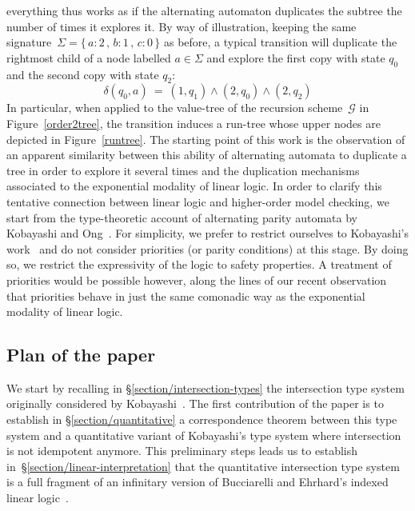 \documentclass{eptcs}
\begin{document}
everything thus works as if the alternating automaton duplicates the subtree the number of times it explores it.
By way of illustration, keeping the same signature~$\Sigma=\{\,a:2 \, , \, b:1 \, , \,  c:0 \, \}$ as before,
a typical transition will duplicate the rightmost child of a node labelled $a\in\Sigma$ 
and explore the first copy with state $q_0$ and the second copy with state $q_2$:
\begin{equation}
\label{delta}
\delta (q_0, a)\ =\  (1,q_1)  \wedge (2,q_0) \wedge (2,q_2)
\end{equation}
In particular, when applied to the value-tree of the recursion scheme~$\mathcal{G}$ in Figure~\ref{order2tree},
the transition induces a run-tree whose upper nodes are depicted in Figure~\ref{runtree}.
The starting point of this work is the observation of an apparent similarity between this ability 
of alternating automata to duplicate a tree in order to explore it several times 
and the duplication mechanisms associated to the exponential modality of linear logic.
In order to clarify this tentative connection between linear logic and higher-order model checking,
we start from the type-theoretic account of alternating parity automata by Kobayashi and Ong~\cite{kobayashi-ong}.
For simplicity, we prefer to restrict ourselves to Kobayashi's work~\cite{koba09} and do not consider priorities
(or parity conditions) at this stage.
By doing so, we restrict the expressivity of the logic to safety properties.
A treatment of priorities would be possible however, along the lines of our recent observation~\cite{tensorial-logic-with-colours}
that priorities behave in just the same comonadic way as the exponential modality of linear logic.


\subsection*{Plan of the paper}
We start by recalling in \S\ref{section/intersection-types} the intersection type system originally considered by Kobayashi~\cite{koba09}.
The first contribution of the paper is to establish in \S\ref{section/quantitative} a correspondence theorem 
between this type system and a quantitative variant of Kobayashi's type system where intersection is not idempotent anymore.
This preliminary steps leads us to establish in~\S\ref{section/linear-interpretation}
that the quantitative intersection type system is a full fragment of an infinitary version 
of Bucciarelli and Ehrhard's indexed linear logic~\cite{ill1,ill2}.
\end{document}
